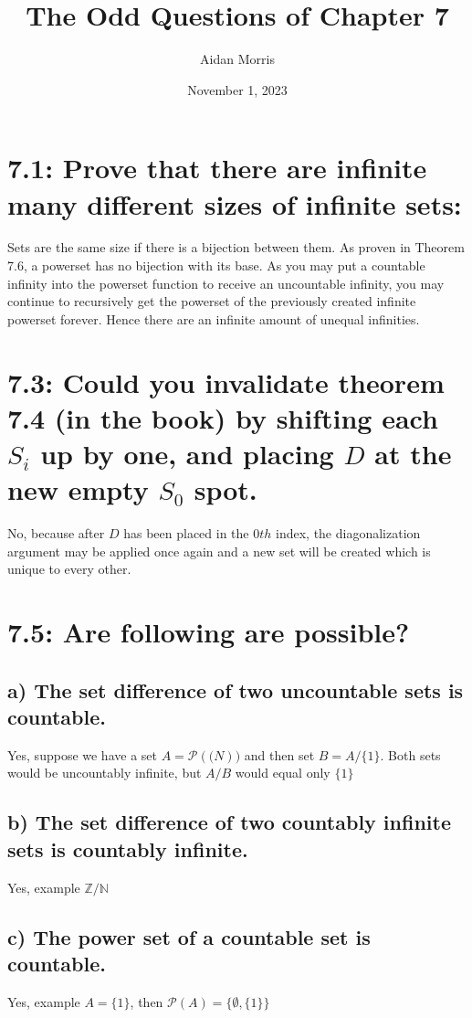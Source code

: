 \documentclass{article}
\title{The Odd Questions of Chapter 7}
\author{Aidan Morris}
\date{November 1, 2023}
\begin{document}
\maketitle
\pagebreak

\section*{7.1: Prove that there are infinite many different sizes of infinite sets:}
Sets are the same size if there is a bijection between them. As proven in Theorem 7.6, a powerset has no bijection with its base. As you may put a countable infinity into the powerset function to receive an uncountable infinity, you may continue to recursively get the powerset of the previously created infinite powerset forever. Hence there are an infinite amount of unequal infinities.

\section*{7.3: Could you invalidate theorem 7.4 (in the book) by shifting each $S_i$ up by one, and placing $D$ at the new empty $S_0$ spot.}

No, because after $D$ has been placed in the $0th$ index, the diagonalization argument may be applied once again and a new set will be created which is unique to every other.

\section*{7.5: Are following are possible?}
\subsection*{a) The set difference of two uncountable sets is countable.}
Yes, suppose we have a set $A = \mathcal{P}(\mathbb(N))$ and then set $B = A/\{1\}$. Both sets would be uncountably infinite, but $A/B$ would equal only $\{1\}$
\subsection*{b) The set difference of two countably infinite sets is countably infinite.}
Yes, example $\mathbb{Z}/\mathbb{N}$
\subsection*{c) The power set of a countable set is countable.}
Yes, example $A = \{1\}$, then $\mathcal{P}(A) = \{\emptyset,\{1\}\}$
\end{document}
